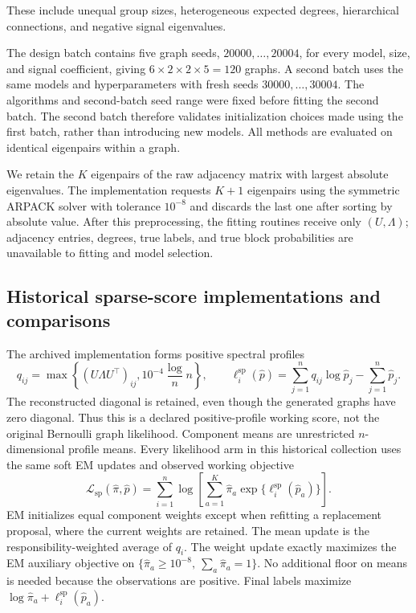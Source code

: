 These include unequal group sizes, heterogeneous expected degrees,
hierarchical connections, and negative signal eigenvalues.

The design batch contains five graph seeds, $20000,\ldots,20004$, for every
model, size, and signal coefficient, giving $6\times2\times2\times5=120$
graphs. A second batch uses the same models and hyperparameters with fresh
seeds $30000,\ldots,30004$. The algorithms and second-batch seed range were
fixed before fitting the second batch. The second batch therefore validates
initialization choices made using the first batch, rather than introducing
new models. All methods are evaluated on identical eigenpairs within a graph.

We retain the $K$ eigenpairs of the raw adjacency matrix with largest absolute
eigenvalues. The implementation requests $K+1$ eigenpairs using the symmetric
ARPACK solver with tolerance $10^{-8}$ and discards the last one after
sorting by absolute value. After this preprocessing, the fitting routines receive
only $(U,\Lambda)$; adjacency entries, degrees, true labels, and true block
probabilities are unavailable to fitting and model selection.

\subsection{Historical sparse-score implementations and comparisons}

The archived implementation forms positive spectral profiles
\begin{equation}
 q_{ij}=\max\left\{(U\Lambda U^\top)_{ij},
                   10^{-4}\frac\log n{n}\right\},\qquad
 \ell_i^{\mathrm{sp}}(\widehat p)=\sum_{j=1}^n q_{ij}\log\widehat p_j-\sum_{j=1}^n\widehat p_j.
 \label{eq:experimental_working_score}
\end{equation}
The reconstructed diagonal is retained, even though the generated graphs
have zero diagonal. Thus this is a declared positive-profile working score,
not the original Bernoulli graph likelihood. Component means are unrestricted
$n$-dimensional profile means. Every likelihood arm in this historical collection uses the same soft EM
updates and observed working objective
\begin{equation}
 \mathcal L_{\mathrm{sp}}(\widehat\pi,\widehat p)=\sum_{i=1}^n\log\left[
   \sum_{a=1}^K \widehat\pi_a\exp\{\ell_i^{\mathrm{sp}}(\widehat p_a)\}\right].
\end{equation}
EM initializes equal component weights except when refitting a replacement
proposal, where the current weights are retained. The mean update is the
responsibility-weighted average of $q_i$. The weight update exactly maximizes
the EM auxiliary objective on $\{\widehat\pi_a\ge10^{-8},\ \sum_a \widehat\pi_a=1\}$.
No additional floor on means is needed because the observations are positive.
Final labels maximize $\log \widehat\pi_a+\ell_i^{\mathrm{sp}}(\widehat p_a)$.

